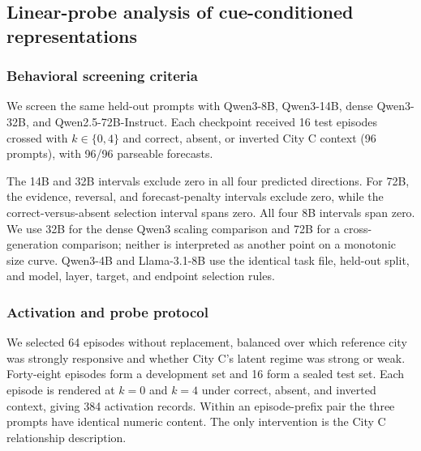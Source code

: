 \subsection{Linear-probe analysis of cue-conditioned representations}
\label{app:coin-city-mechanistic-probe}

\subsubsection{Behavioral screening criteria}
We screen the same held-out prompts with Qwen3-8B, Qwen3-14B, dense Qwen3-32B, and
Qwen2.5-72B-Instruct. Each checkpoint received 16 test episodes crossed with
$k\in\{0,4\}$ and correct, absent, or inverted City C context (96 prompts), with
96/96 parseable forecasts.

\begin{center}
\begin{minipage}{\linewidth}
\centering
{}
\label{tab:coin-city-behavioral-gate}
\scriptsize
\setlength{\tabcolsep}{2.4pt}
\resizebox{\linewidth}{!}{}
\end{minipage}
\end{center}

The 14B and 32B intervals exclude zero in all four predicted directions. For 72B,
the evidence, reversal, and forecast-penalty intervals exclude zero, while the
correct-versus-absent selection interval spans zero. All four 8B intervals span
zero. We use 32B for the dense Qwen3 scaling comparison and 72B for a
cross-generation comparison; neither is interpreted as another point on a
monotonic size curve. Qwen3-4B and Llama-3.1-8B use the identical task file,
held-out split, and model, layer, target, and endpoint selection rules.

\subsubsection{Activation and probe protocol}
We selected 64 episodes without replacement, balanced over which reference city
was strongly responsive and whether City C's latent regime was strong or weak.
Forty-eight episodes form a development set and 16 form a sealed test set. Each
episode is rendered at $k=0$ and $k=4$ under correct, absent, and inverted context,
giving 384 activation records. Within an episode-prefix pair the three prompts
have identical numeric content. The only intervention is the City C relationship
description.

